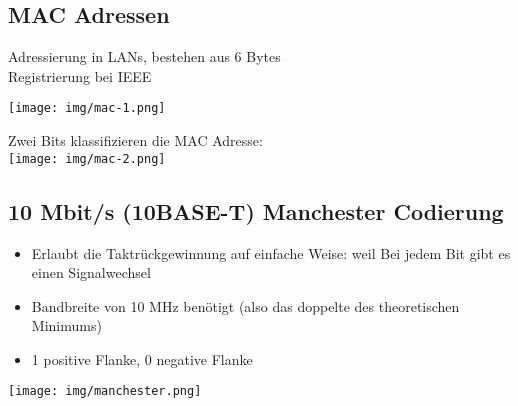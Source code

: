 {\begin{multicols*}{2}

    \end{multicols*}

}
\newpage
\subsection{MAC Adressen}{
Adressierung in LANs, bestehen aus 6 Bytes \\

{Registrierung bei IEEE}

\texttt{[image: img/mac-1.png]}

{
    {Zwei Bits klassifizieren die MAC Adresse:} \\
    \texttt{[image: img/mac-2.png]}
}
}
\vfill\null
\columnbreak
\subsection{10 Mbit/s (10BASE-T) Manchester Codierung}{
    \begin{itemize}[noitemsep]
        \item Erlaubt die Taktrückgewinnung auf einfache Weise: weil Bei jedem Bit gibt es einen Signalwechsel
        \item Bandbreite von 10 MHz benötigt (also das doppelte des theoretischen Minimums)
        \item   1 positive Flanke, 0 negative Flanke
    \end{itemize}

    \texttt{[image: img/manchester.png]}

}

